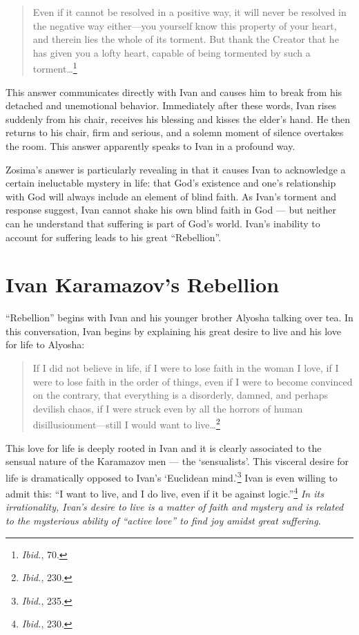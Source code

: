 \begin{quote}
\singlespacing
Even if it cannot be resolved in a positive way, it will never be resolved in the negative way either---you yourself know this property of your heart, and therein lies the whole of its torment. But thank the Creator that he has given you a lofty heart, capable of being tormented by such a torment\ldots\footnote{\emph{Ibid.}, 70.} 
\end{quote}

This answer communicates directly with Ivan and causes him to break from his detached and unemotional behavior. Immediately after these words, Ivan rises suddenly from his chair, receives his blessing and kisses the elder's hand. He then returns to his chair, firm and serious, and a solemn moment of silence overtakes the room. This answer apparently speaks to Ivan in a profound way. 

Zosima's answer is particularly revealing in that it causes Ivan to acknowledge a certain ineluctable mystery in life: that God's existence and one's relationship with God will always include an element of blind faith. As Ivan's torment and response suggest, Ivan cannot shake his own blind faith in God --- but neither can he understand that suffering is part of God's world. Ivan's inability to account for suffering leads to his great ``Rebellion''.

\section{Ivan Karamazov's Rebellion}
``Rebellion'' begins with Ivan and his younger brother Alyosha talking over tea. In this conversation, Ivan begins by explaining his great desire to live and his love for life to Alyosha:

\begin{quote}
\singlespacing
If I did not believe in life, if I were to lose faith in the woman I love, if I were to lose faith in the order of things, even if I were to become convinced on the contrary, that everything is a disorderly, damned, and perhaps devilish chaos, if I were struck even by all the horrors of human disillusionment---still I would want to live\ldots\footnote{\emph{Ibid.}, 230.}
\end{quote}

This love for life is deeply rooted in Ivan and it is clearly associated to the sensual nature of the Karamazov men --- the `sensualists'. This visceral desire for life is dramatically opposed to Ivan's `Euclidean mind.'\footnote{\emph{Ibid.}, 235.} Ivan is even willing to admit this: ``I want to live, and I do live, even if it be against logic.''\footnote{\emph{Ibid.}, 230.} \emph{In its irrationality, Ivan's desire to live is a matter of faith and mystery and is related to the mysterious ability of ``active love'' to find joy amidst great suffering.}

